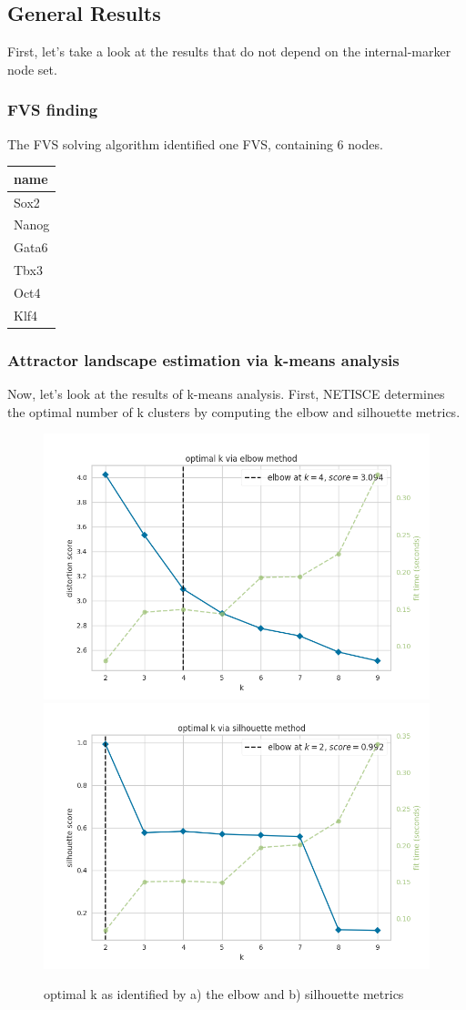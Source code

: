 \documentclass[
]{book}
\begin{document}
\hypertarget{general-results}{%
\subsection{General Results}\label{general-results}}

First, let's take a look at the results that do not depend on the internal-marker node set.

\hypertarget{section-id}{%
\subsubsection*{FVS finding}\label{section-id}}

The FVS solving algorithm identified one FVS, containing 6 nodes.

\begin{tabular}{l}
\hline
name\\
\hline
Sox2\\
\hline
Nanog\\
\hline
Gata6\\
\hline
Tbx3\\
\hline
Oct4\\
\hline
Klf4\\
\hline
\end{tabular}

\hypertarget{section-id}{%
\subsubsection*{Attractor landscape estimation via k-means analysis}\label{section-id}}

Now, let's look at the results of k-means analysis. First, NETISCE determines the optimal number of k clusters by computing the elbow and silhouette metrics.

\begin{figure}
\includegraphics[width=0.5\linewidth]{ipsc/results/elbow} \includegraphics[width=0.5\linewidth]{ipsc/results/silhouette} \caption{optimal k as identified by a) the elbow and b) silhouette metrics}\label{fig:unnamed-chunk-25}
\end{figure}
\end{document}
